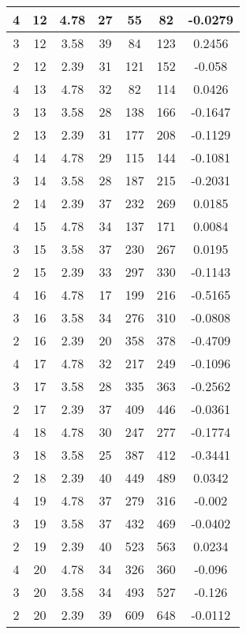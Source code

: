 \documentclass[letterpaper, 12pt]{article}
\begin{document}
\begin{longtable}{|c|c|c|c|c|c|c|}
\hline
4 & 12 & 4.78 & 27 & 55 & 82 & -0.0279 \\
\hline
3 & 12 & 3.58 & 39 & 84 & 123 & 0.2456 \\
\hline
2 & 12 & 2.39 & 31 & 121 & 152 & -0.058 \\
\hline
4 & 13 & 4.78 & 32 & 82 & 114 & 0.0426 \\
\hline
3 & 13 & 3.58 & 28 & 138 & 166 & -0.1647 \\
\hline
2 & 13 & 2.39 & 31 & 177 & 208 & -0.1129 \\
\hline
4 & 14 & 4.78 & 29 & 115 & 144 & -0.1081 \\
\hline
3 & 14 & 3.58 & 28 & 187 & 215 & -0.2031 \\
\hline
2 & 14 & 2.39 & 37 & 232 & 269 & 0.0185 \\
\hline
4 & 15 & 4.78 & 34 & 137 & 171 & 0.0084 \\
\hline
3 & 15 & 3.58 & 37 & 230 & 267 & 0.0195 \\
\hline
2 & 15 & 2.39 & 33 & 297 & 330 & -0.1143 \\
\hline
4 & 16 & 4.78 & 17 & 199 & 216 & -0.5165 \\
\hline
3 & 16 & 3.58 & 34 & 276 & 310 & -0.0808 \\
\hline
2 & 16 & 2.39 & 20 & 358 & 378 & -0.4709 \\
\hline
4 & 17 & 4.78 & 32 & 217 & 249 & -0.1096 \\
\hline
3 & 17 & 3.58 & 28 & 335 & 363 & -0.2562 \\
\hline
2 & 17 & 2.39 & 37 & 409 & 446 & -0.0361 \\
\hline
4 & 18 & 4.78 & 30 & 247 & 277 & -0.1774 \\
\hline
3 & 18 & 3.58 & 25 & 387 & 412 & -0.3441 \\
\hline
2 & 18 & 2.39 & 40 & 449 & 489 & 0.0342 \\
\hline
4 & 19 & 4.78 & 37 & 279 & 316 & -0.002 \\
\hline
3 & 19 & 3.58 & 37 & 432 & 469 & -0.0402 \\
\hline
2 & 19 & 2.39 & 40 & 523 & 563 & 0.0234 \\
\hline
4 & 20 & 4.78 & 34 & 326 & 360 & -0.096 \\
\hline
3 & 20 & 3.58 & 34 & 493 & 527 & -0.126 \\
\hline
2 & 20 & 2.39 & 39 & 609 & 648 & -0.0112 \\
\hline
\end{longtable}
\end{document}

